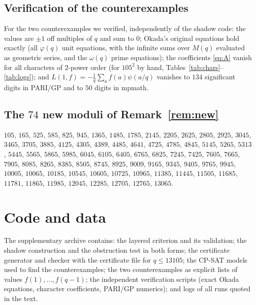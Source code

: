 \documentclass[11pt]{amsart}
\theoremstyle{definition}
\theoremstyle{remark}
\numberwithin{equation}{section}
\begin{document}
\subsection*{Verification of the counterexamples}
For the two counterexamples we verified, independently of the shadow code: the values are $\pm1$ off multiples of $q$ and sum to $0$; Okada's original equations hold exactly (all $\varphi(q)$ unit equations, with the infinite sums over $M(q)$ evaluated as geometric series, and the $\omega(q)$ prime equations); the coefficients \eqref{eq:A} vanish for all characters of $2$-power order (for $105^2$ by hand, Tables~\ref{tab:chars}--\ref{tab:logs}); and $L(1,f)=-\frac1q\sum_af(a)\psi(a/q)$ vanishes to $134$ significant digits in PARI/GP and to $50$ digits in mpmath.

\subsection*{The $74$ new moduli of Remark~\ref{rem:new}}
$105$, $165$, $525$, $585$, $825$, $945$, $1365$, $1485$, $1785$, $2145$, $2205$, $2625$, $2805$, $2925$, $3045$, $3465$, $3705$, $3885$, $4125$, $4305$, $4389$, $4485$, $4641$, $4725$, $4785$, $4845$, $5145$, $5265$, $5313$, $5445$, $5565$, $5865$, $5985$, $6045$, $6105$, $6405$, $6765$, $6825$, $7245$, $7425$, $7605$, $7665$, $7905$, $8085$, $8265$, $8385$, $8505$, $8745$, $8925$, $9009$, $9165$, $9345$, $9405$, $9765$, $9945$, $10005$, $10065$, $10185$, $10545$, $10605$, $10725$, $10965$, $11385$, $11445$, $11505$, $11685$, $11781$, $11865$, $11985$, $12045$, $12285$, $12705$, $12765$, $13065$.

\section{Code and data}\label{app:code}
The supplementary archive contains: the layered criterion and its validation; the shadow construction and the obstruction test in both forms; the certificate generator and checker with the certificate file for $q\le13105$; the CP-SAT models used to find the counterexamples; the two counterexamples as explicit lists of values $f(1),\dots,f(q-1)$; the independent verification scripts (exact Okada equations, character coefficients, PARI/GP numerics); and logs of all runs quoted in the text.
\end{document}
